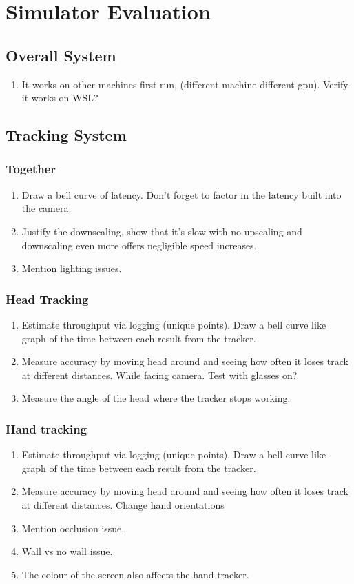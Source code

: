 \section{Simulator Evaluation}

\subsection{Overall System}
\begin{enumerate}
	\item It works on other machines first run, (different machine different gpu). Verify it works on WSL?
\end{enumerate}

\subsection{Tracking System}
\subsubsection{Together}
\begin{enumerate}
	\item Draw a bell curve of latency. Don't forget to factor in the latency built into the camera. 
	\item Justify the downscaling, show that it's slow with no upscaling and downscaling even more offers negligible speed increases.  
	\item Mention lighting issues.
\end{enumerate}

\subsubsection{Head Tracking}
\begin{enumerate}
	\item Estimate throughput via logging (unique points). Draw a bell curve like graph of the time between each result from the tracker.
	\item Measure accuracy by moving head around and seeing how often it loses track at different distances. While facing camera. Test with glasses on?
	\item Measure the angle of the head where the tracker stops working.  
\end{enumerate}

\subsubsection{Hand tracking}
\begin{enumerate}
	\item Estimate throughput via logging (unique points). Draw a bell curve like graph of the time between each result from the tracker.
	\item Measure accuracy by moving head around and seeing how often it loses track at different distances. Change hand orientations
	\item Mention occlusion issue. 
	\item Wall vs no wall issue. 
	\item The colour of the screen also affects the hand tracker. 
\end{enumerate}


